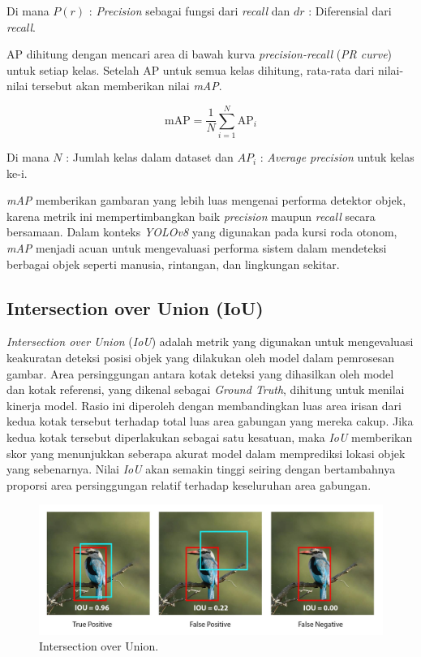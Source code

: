 Di mana \(P(r)\) : \emph{Precision} sebagai fungsi dari \emph{recall} dan \(dr\) : Diferensial dari \emph{recall}.

AP dihitung dengan mencari area di bawah kurva \emph{precision-recall} (\emph{PR curve}) untuk setiap kelas. Setelah AP untuk semua kelas dihitung, rata-rata dari nilai-nilai tersebut akan memberikan nilai \emph{mAP}.

\begin{equation} 
  \mathrm{mAP} = \frac{1}{N} \sum_{i=1}^{N} \mathrm{AP}_i 
\end{equation}

Di mana \(N\) : Jumlah kelas dalam dataset dan \(AP_i\) : \emph{Average precision} untuk kelas ke-i.

\emph{mAP} memberikan gambaran yang lebih luas mengenai performa detektor objek, karena metrik ini mempertimbangkan baik \emph{precision} maupun \emph{recall} secara bersamaan. Dalam konteks \emph{YOLOv8} yang digunakan pada kursi roda otonom, \emph{mAP} menjadi acuan untuk mengevaluasi performa sistem dalam mendeteksi berbagai objek seperti manusia, rintangan, dan lingkungan sekitar.

\subsection{Intersection over Union (IoU)}
\label{subsec:IoU}

\emph{Intersection over Union} (\emph{IoU}) adalah metrik yang digunakan untuk mengevaluasi keakuratan deteksi posisi objek yang dilakukan oleh model dalam pemrosesan gambar. Area persinggungan antara kotak deteksi yang dihasilkan oleh model dan kotak referensi, yang dikenal sebagai \emph{Ground Truth}, dihitung untuk menilai kinerja model. Rasio ini diperoleh dengan membandingkan luas area irisan dari kedua kotak tersebut terhadap total luas area gabungan yang mereka cakup. Jika kedua kotak tersebut diperlakukan sebagai satu kesatuan, maka \emph{IoU} memberikan skor yang menunjukkan seberapa akurat model dalam memprediksi lokasi objek yang sebenarnya. Nilai \emph{IoU} akan semakin tinggi seiring dengan bertambahnya proporsi area persinggungan relatif terhadap keseluruhan area gabungan.

\begin{figure}[H]
  \centering
  \includegraphics[scale=0.27]{gambar/IoU bbox.jpg}
  \caption{Intersection over Union.}
  \label{fig:IoU bbox}
\end{figure}

